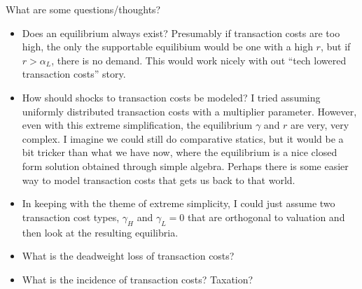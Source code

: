 What are some questions/thoughts?
\begin{itemize}
\item Does an equilibrium always exist? Presumably if transaction costs are too high, the only the supportable equilibium would be one with a high $r$, but if $r > \alpha_L$, there is no demand. This would work nicely with out ``tech lowered transaction costs'' story. 
\item How should shocks to transaction costs be modeled? I tried assuming uniformly distributed transaction costs with a multiplier parameter. However, even with this extreme simplification, the equilibrium $\gamma$ and $r$ are very, very complex. I imagine we could still do comparative statics, but it would be a bit tricker than what we have now, where the equilibrium is a nice closed form solution obtained through simple algebra. Perhaps there is some easier way to model transaction costs that gets us back to that world. 
\item In keeping with the theme of extreme simplicity, I could just assume two transaction cost types, $\gamma_H$ and $\gamma_L = 0$ that are orthogonal to valuation and then look at the resulting equilibria.
\item What is the deadweight loss of transaction costs?
  \item What is the incidence of transaction costs? Taxation? 
\end{itemize} 

